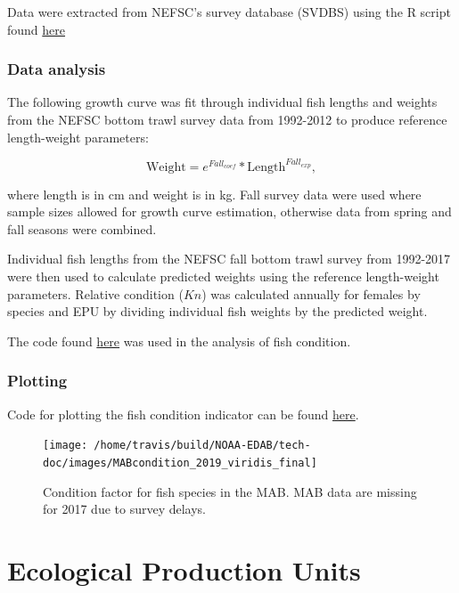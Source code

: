 \documentclass[
]{book}
\begin{document}
Data were extracted from NEFSC's survey database (SVDBS) using the R script found \href{https://github.com/Laurels1/Condition/blob/master/R/pull_from_svdbs.R}{here}

\hypertarget{data-analysis-12}{%
\subsection{Data analysis}\label{data-analysis-12}}

The following growth curve was fit through individual fish lengths and weights from the NEFSC bottom trawl survey data from 1992-2012 to produce reference length-weight parameters:

\[\textrm{Weight} = e^{Fall_{coef}} * \textrm{Length}^{Fall_{exp}},\]

where length is in cm and weight is in kg. Fall survey data were used where sample sizes allowed for growth curve estimation, otherwise data from spring and fall seasons were combined.

Individual fish lengths from the NEFSC fall bottom trawl survey from 1992-2017 were then used to calculate predicted weights using the reference length-weight parameters. Relative condition (\(Kn\)) was calculated annually for females by species and EPU by dividing individual fish weights by the predicted weight.

The code found \href{https://github.com/Laurels1/Condition/blob/master/R/RelConditionEPU.R}{here} was used in the analysis of fish condition.

\hypertarget{plotting-9}{%
\subsection{Plotting}\label{plotting-9}}

Code for plotting the fish condition indicator can be found \href{https://github.com/Laurels1/Condition/blob/master/R/Condition_plot_viridis_final.R}{here}.

\begin{figure}
\texttt{[image: /home/travis/build/NOAA-EDAB/tech-doc/images/MABcondition\_2019\_viridis\_final]} \caption{ Condition factor for fish species in the MAB. MAB data are missing for 2017 due to survey delays.}\label{fig:unnamed-chunk-16}
\end{figure}

\hypertarget{epu}{%
\chapter{Ecological Production Units}\label{epu}}
\end{document}
